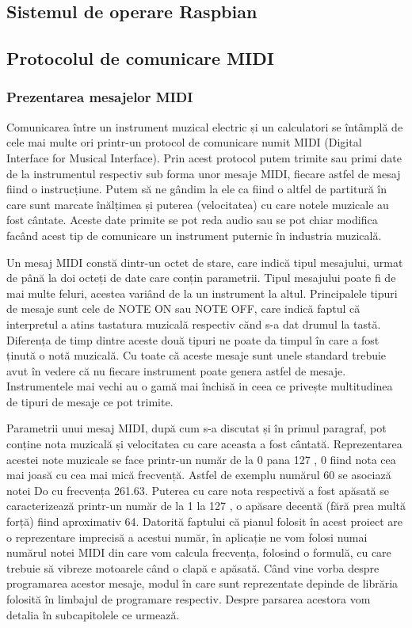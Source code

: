 \documentclass[../IoMusT.tex]{subfiles}
\begin{document}
\subsection{Sistemul de operare Raspbian}

\subsection{Protocolul de comunicare MIDI}
\subsubsection{Prezentarea mesajelor MIDI}
Comunicarea între un instrument muzical electric și un calculatori se întâmplă de cele mai multe ori printr-un protocol de comunicare numit MIDI (Digital Interface for Musical Interface). Prin acest protocol putem trimite sau primi date de la instrumentul respectiv sub forma unor mesaje MIDI, fiecare astfel de mesaj fiind o instrucțiune. Putem să ne gândim la ele ca fiind o altfel de partitură în care sunt marcate înălțimea și puterea (velocitatea) cu care notele muzicale au fost cântate. Aceste date primite se pot reda audio sau se pot chiar modifica facând acest tip de comunicare un instrument puternic în industria muzicală. 
\\
\par Un mesaj MIDI constă dintr-un octet de stare, care indică tipul mesajului, urmat de până la doi octeți de date care conțin parametrii. Tipul mesajului poate fi de mai multe feluri, acestea variând de la un instrument la altul. Principalele tipuri de mesaje sunt cele de NOTE ON sau NOTE OFF, care indică faptul că interpretul a atins tastatura muzicală respectiv cănd s-a dat drumul la tastă. Diferența de timp dintre aceste două tipuri ne poate da timpul în care a fost ținută o notă muzicală. Cu toate că aceste mesaje sunt unele standard trebuie avut în vedere că nu fiecare instrument poate genera astfel de mesaje. Instrumentele mai vechi au o gamă mai închisă in ceea ce privește multitudinea de tipuri de mesaje ce pot trimite.
\\ 
\par Parametrii unui mesaj MIDI, după cum s-a discutat și în primul paragraf, pot conține nota muzicală și velocitatea cu care aceasta a fost cântată. Reprezentarea acestei note muzicale se face printr-un număr de la 0 pana 127 \cite{MidiSoftware}, 0 fiind nota cea mai joasă cu cea mai mică frecvență. Astfel de exemplu numărul 60 se asociază notei Do cu frecvența 261.63. Puterea cu care nota respectivă a fost apăsată se caracterizează printr-un număr de la 1 la 127 \cite{MidiSoftware}, o apăsare decentă (fără prea multă forță) fiind aproximativ 64. Datorită faptului că pianul folosit în acest proiect are o reprezentare imprecisă a acestui număr, în aplicație ne vom folosi numai numărul notei MIDI din care vom calcula frecvența, folosind o formulă, cu care trebuie să vibreze motoarele când o clapă e apăsată. Când vine vorba despre programarea acestor mesaje, modul în care sunt reprezentate depinde de librăria folosită în limbajul de programare respectiv. Despre parsarea acestora vom detalia în subcapitolele ce urmează.
\end{document}
